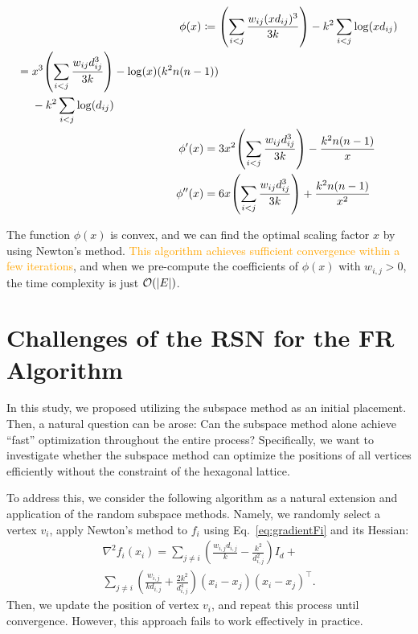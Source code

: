 \documentclass[dvipdfmx,lettersize,journal]{IEEEtran}
\newcommand{\orange}[1]{\textcolor{orange}{#1}}
\newcommand{\defeq}{\coloneqq}
\begin{document}
\begin{align*}
  \phi(x) \defeq {} & \qty(\sum_{i < j} \frac{w_{ij} (xd_{ij})^3}{3k}) - k^2 \sum_{i < j} \log(x d_{ij})                                     \\
  \begin{split}
    = {} & x^3 \qty(\sum_{i < j} \frac{w_{ij} d_{ij}^3}{3k}) - \log(x)(k^2 n(n-1)) \\
         & - k^2 \sum_{i < j} \log(d_{ij})
  \end{split} \\
  \phi'(x) = {}     & 3x^2 \qty(\sum_{i < j} \frac{w_{ij} d_{ij}^3}{3k}) - \frac{k^2 n(n-1)}{x}                                              \\
  \phi''(x) = {}    & 6x \qty(\sum_{i < j} \frac{w_{ij} d_{ij}^3}{3k}) + \frac{k^2 n(n-1)}{x^2}
\end{align*}

The function $\phi(x)$ is convex, and we can find the optimal scaling factor $x$ by using Newton's method.
\orange{This algorithm achieves sufficient convergence within a few iterations}, and when we pre-compute the coefficients of $\phi(x)$ with $w_{i,j} > 0$, the time complexity is just $\order{\abs{E}}$.

\section{Challenges of the RSN for the FR Algorithm}\label{sec:problemRSN}

In this study, we proposed utilizing the subspace method as an initial placement. Then, a natural question can be arose: Can the subspace method alone achieve ``fast'' optimization throughout the entire process?
Specifically, we want to investigate whether the subspace method can optimize the positions of all vertices efficiently without the constraint of the hexagonal lattice.

To address this, we consider the following algorithm as a natural extension and application of the random subspace methods. Namely, we randomly select a vertex $v_i$, apply Newton's method to $f_i$ using Eq.~\ref{eq:gradientFi} and its Hessian:
\begin{gather*}
  \nabla^2 f_i(x_i) = \sum_{j \neq i} \left(\frac{w_{i,j}d_{i,j}}{k} - \frac{k^2}{d_{i,j}^2}\right) I_d + \\
  \sum_{j \neq i} \left(\frac{w_{i,j}}{k d_{i,j}} + \frac{2k^2}{d_{i,j}^4}\right) (x_i - x_j)(x_i - x_j)^\top.
\end{gather*}
Then, we update the position of vertex $v_i$, and repeat this process until convergence.
However, this approach fails to work effectively in practice.
\end{document}
